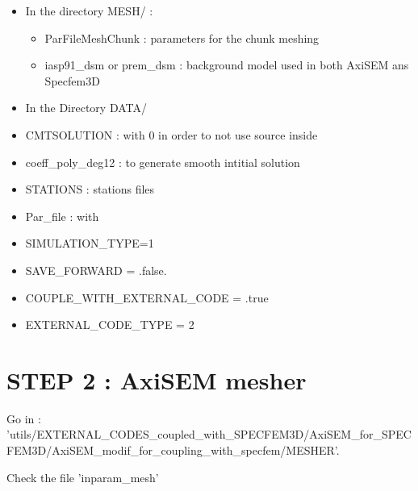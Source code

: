 \documentclass[11pt]{article}
\begin{document}
\begin{itemize}

\item[\textbullet] In the directory MESH/ :

\begin{itemize}

\item[\textbullet] ParFileMeshChunk  : parameters for the chunk meshing

\item[\textbullet] iasp91\_dsm or prem\_dsm : background model used in both AxiSEM ans Specfem3D

\end{itemize}


\item[\textbullet] In the Directory DATA/

\item[\textbullet] CMTSOLUTION  : with 0 in order to not use source inside

\item[\textbullet] coeff\_poly\_deg12 : to generate smooth intitial solution

\item[\textbullet] STATIONS  : stations files

\item[\textbullet] Par\_file : with

\item[\textbullet] SIMULATION\_TYPE=1

\item[\textbullet] SAVE\_FORWARD = .false.

\item[\textbullet] COUPLE\_WITH\_EXTERNAL\_CODE = .true

\item[\textbullet] EXTERNAL\_CODE\_TYPE    = 2

\end{itemize}


\section{STEP 2 : AxiSEM mesher}

\noindent Go in  : {\scriptsize  'utils/EXTERNAL\_CODES\_coupled\_with\_SPECFEM3D/AxiSEM\_for\_SPECFEM3D/AxiSEM\_modif\_for\_coupling\_with\_specfem/MESHER'}.

\medskip

\noindent Check the file 'inparam\_mesh'

\medskip
\end{document}
